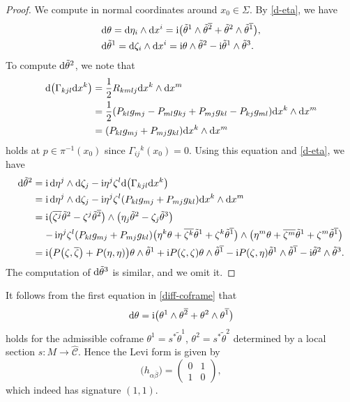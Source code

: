 \documentclass[pdftex]{sigma}
\renewcommand\a{\alpha}
\renewcommand\b{\beta}
\renewcommand\th{\theta}
\newcommand\ol{\overline}
\newcommand{\wh}{\widehat}
\numberwithin{equation}{section}
\begin{document}
\begin{proof}
We compute in normal coordinates around $x_0\in\Sigma$. By \eqref{d-eta}, we have
\begin{align*}
&{\rm d}\theta={\rm d}\eta_i\wedge {\rm d}x^i={\rm i}\bigl(\tilde\theta^1\wedge\tilde\theta^{\ol2}+\tilde\theta^2\wedge\tilde\theta^{\ol1}\bigr), \\
&{\rm d}\tilde\th^1={\rm d}\zeta_i\wedge {\rm d}x^i={\rm i}\theta\wedge\tilde\theta^2-{\rm i}\tilde\theta^1\wedge\tilde\theta^3.
\end{align*}
To compute ${\rm d}\tilde\theta^2$, we note that
\begin{align*}
{\rm d}\bigl(\Gamma_{kjl} {\rm d}x^k\bigr)&=\frac{1}{2}R_{kmlj}{\rm d}x^k\wedge {\rm d}x^m \\
&=\frac{1}{2}(P_{kl}g_{mj}-P_{ml}g_{kj}+P_{mj}g_{kl}-P_{kj}g_{ml}){\rm d}x^k\wedge {\rm d}x^m \\
&=(P_{kl}g_{mj}+P_{mj}g_{kl}){\rm d}x^k\wedge {\rm d}x^m
\end{align*}
holds at $p\in \pi^{-1}(x_0)$ since $\Gamma_{ij}{}^k(x_0)=0$. Using this equation and \eqref{d-eta}, we have
\begin{align*}
{\rm d}\tilde\theta^2={}&{\rm i}\,{\rm d}\eta^j\wedge {\rm d}\zeta_j-{\rm i}\eta^j\zeta^l{\rm d}\bigl(\Gamma_{kjl} {\rm d}x^k\bigr) \\
={}&{\rm i}\,{\rm d}\eta^j\wedge {\rm d}\zeta_j-{\rm i}\eta^j\zeta^l (P_{kl}g_{mj}+P_{mj}g_{kl}){\rm d}x^k\wedge {\rm d}x^m \\
={}&{\rm i}\bigl(\ol{\zeta^j}\tilde\th^2-\zeta^j\tilde\th^{\ol2}\bigr)\wedge\bigl(\eta_j\tilde\theta^2-\zeta_j\tilde\theta^3\bigr) \\
&{-}\,{\rm i}\eta^j\zeta^l (P_{kl}g_{mj}+P_{mj}g_{kl})\bigl(\eta^k\theta+\ol{\zeta^k}\tilde\theta^1+\zeta^k\tilde\theta^{\ol1}\bigr)\wedge \bigl(\eta^m\theta+\ol{\zeta^m}\tilde\theta^1+\zeta^m\tilde\theta^{\ol1}\bigr) \\
={}&{\rm i}\bigl(P\bigl(\zeta, \ol\zeta\bigr)+P(\eta, \eta)\bigr)\theta\wedge\tilde\theta^1+{\rm i}P(\zeta, \zeta)\theta\wedge\tilde\theta^{\ol1} -{\rm i}P(\zeta, \eta)\tilde\theta^1\wedge\tilde\theta^{\ol1}-{\rm i}\tilde\theta^2\wedge\tilde\theta^3.
\end{align*}
The computation of ${\rm d}\tilde\th^3$ is similar, and we omit it.
\end{proof}

It follows from the first equation in \eqref{diff-coframe} that
\[
{\rm d}\th={\rm i}\bigl(\theta^1\wedge\theta^{\ol2}+\theta^2\wedge\theta^{\ol1}\bigr)
\]
holds for the admissible coframe $\th^1=s^*\tilde \th^1$, $\th^2=s^*\tilde \th^2$ determined by a local section $s\colon M\to \wh{\mathcal{C}}$. Hence the Levi form is given by
\[
\bigl(h_{\a\ol\b}\bigr)=\begin{pmatrix} 0 & 1 \\ 1 & 0 \end{pmatrix},
\]
which indeed has signature $(1, 1)$.
\end{document}
